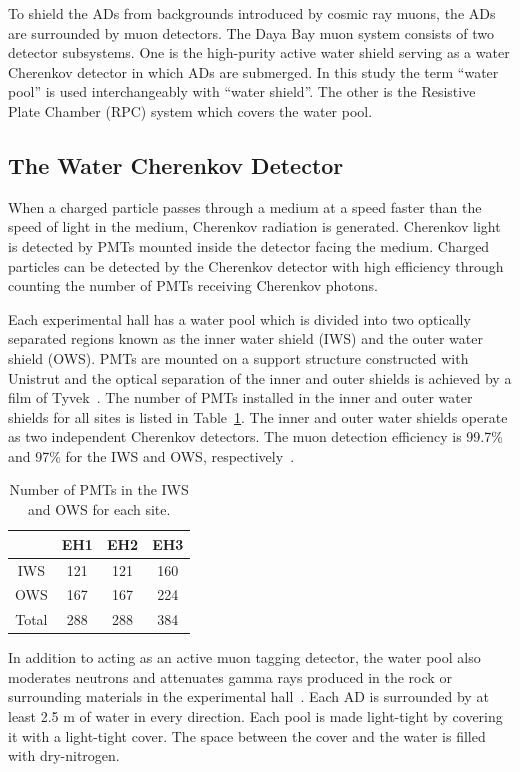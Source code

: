 To shield the ADs from backgrounds introduced by cosmic ray muons, the ADs are surrounded by muon detectors. The Daya Bay muon system consists of two detector subsystems. One is the high-purity active water shield serving as a water Cherenkov detector in which ADs are submerged. In this study the term ``water pool'' is used interchangeably with ``water shield''. The other is the Resistive Plate Chamber (RPC) system which covers the water pool.

\subsection{The Water Cherenkov Detector}

When a charged particle passes through a medium at a speed faster than the speed of light in the medium, Cherenkov radiation is generated. Cherenkov light is detected by PMTs mounted inside the detector facing the medium. Charged particles can be detected by the Cherenkov detector with high efficiency through counting the number of PMTs receiving Cherenkov photons.

Each experimental hall has a water pool which is divided into two optically separated regions known as the inner water shield (IWS) and the outer water shield (OWS). PMTs are mounted on a support structure constructed with Unistrut and the optical separation of the inner and outer shields is achieved by a film of Tyvek~\cite{DuPont}. The number of PMTs installed in the inner and outer water shields for all sites is listed in Table~\ref{table:NPMT_water}. The inner and outer water shields operate as two independent Cherenkov detectors. The muon detection efficiency is 99.7\% and 97\% for the IWS and OWS, respectively~\cite{dayabay2012_2}.
\begin{table}
	\centering
	\begin{tabular}{cccc}
		\toprule
		& EH1 & EH2 & EH3 \\
		\midrule
		IWS & 121 & 121 & 160 \\
		OWS & 167 & 167 & 224 \\
		Total & 288 & 288 & 384 \\
		\bottomrule
	\end{tabular}
	\caption{Number of PMTs in the IWS and OWS for each site.}
	\label{table:NPMT_water}
\end{table}
In addition to acting as an active muon tagging detector, the water pool also moderates neutrons and attenuates gamma rays produced in the rock or surrounding materials in the experimental hall~\cite{dayabay2014}. Each AD is surrounded by at least 2.5 m of water in every direction. Each pool is made light-tight by covering it with a light-tight cover. The space between the cover and the water is filled with dry-nitrogen.

